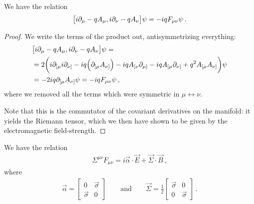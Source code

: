 \documentclass[main.tex]{subfiles}
\begin{document}
\begin{claim}
We have the relation 
%
\begin{align} \label{eq:antisymmetric-covariant-derivative-field-strength}
\qty[i \partial_{\mu } - q A_{\mu }, i \partial_{\nu } - q A_{\nu }] \psi 
= -iq F_{\mu \nu } \psi 
\,.
\end{align}
\end{claim}

\begin{proof}
We write the terms of the product out, antisymmetrizing everything: 
%
\begin{subequations}
\begin{align}
&\qty[i \partial_{\mu } - q A_{\mu }, i \partial_{\nu } - q A_{\nu }] \psi = \\
&=2 \qty(i \partial_{[\mu }i \partial_{\nu ]}
- i q \qty(\partial_{[\mu } A_{\nu ]} ) 
-iq A_{[\nu } \partial_{\mu ]}
-iq A_{[\mu } \partial_{\nu ]}
+ q^2 A_{[\mu } A_{\nu ]}) \psi   \\
&= -2iq \partial_{[\mu } A_{\nu ]} \psi 
= -iq F_{\mu \nu } \psi 
\,,
\end{align}
\end{subequations}
%
where we removed all the terms which were symmetric in \(\mu \leftrightarrow \nu \). 

Note that this is the commutator of the covariant derivatives on the manifold: it yields the Riemann tensor, which we then have shown to be given by the electromagnetic field-strength.
\end{proof}

\begin{claim}
We have the relation 
%
\begin{align}
\Sigma^{\mu \nu }F_{\mu \nu }
=i \vec{\alpha} \cdot \vec{E} + \vec{\Sigma} \cdot \vec{B}
\,,
\end{align}
%
where 
%
\begin{subequations}
\begin{align}
\vec{\alpha} = \left[\begin{array}{cc}
0 & \vec{\sigma} \\ 
\vec{\sigma} & 0
\end{array}\right] 
\qquad \text{and} \qquad
\vec{\Sigma} = \frac{1}{2} \left[\begin{array}{cc}
\vec{\sigma} & 0 \\ 
0 & \vec{\sigma}
\end{array}\right]
\,.
\end{align}
\end{subequations}
\end{claim}
\end{document}
